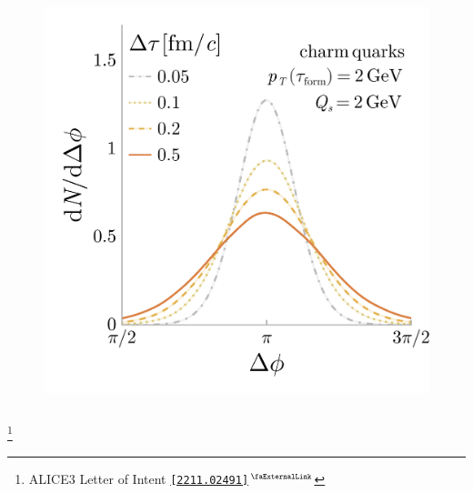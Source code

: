 \documentclass[aspectratio=169,11pt,usenames,dvipsnames]{beamer}
\renewcommand{\thefootnote}{\color{customblue}\faPaperPlaneO}
\newcommand\blfootnote[1]{%
  \begingroup
  \renewcommand\thefootnote{}\footnote{#1}%
  \addtocounter{footnote}{-1}%
  \endgroup
}
\begin{document}
\begin{frame}
\begin{center}
\begin{columns}[onlytextwidth,t]
\begin{center}
                \vspace{-10pt}
                \begin{figure}
                    \centering
                    \includegraphics[width=0.8\columnwidth]{images/final_dNdphi_tau_dep_charm_v2.png}
                \end{figure}
            \end{center}
        \end{columns}    

    \end{center}
    \vspace{-10pt}
    \blfootnote{\scriptsize ALICE3 Letter of Intent \href{https://arxiv.org/abs/2211.02491}{{\color{palgold}\texttt{[2211.02491]$^\text{\scalebox{0.9}{\faExternalLink}}$}}}}
    
\end{frame}

\end{document}
